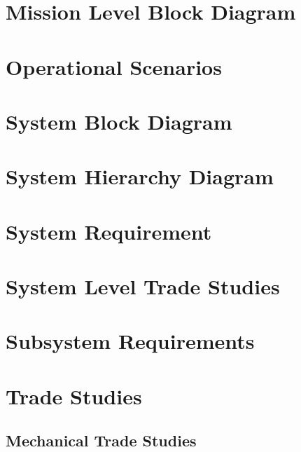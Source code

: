 \documentclass[12pt, letterpaper]{article}
\begin{document}
\section{Mission Level Block Diagram}
\label{sect:MLBD}
\newpage
\section{Operational Scenarios}
\label{sect:FFBD}

\begin{landscape}
\section{System Block Diagram}
\label{sect:SBD}
\newpage
\section{System Hierarchy Diagram}
\label{sect:SHD}
\end{landscape}

\section{System Requirement}
\captionsetup[table]{list=no}
\captionsetup[table]{list=yes}
\setcounter{table}{\ref{risktable}}

\section{System Level Trade Studies}
\newpage
\section{Subsystem Requirements}	%
\label{sect:Subsystem Requirements}
\captionsetup[table]{list=no}







\captionsetup[table]{list=yes}
\setcounter{table}{\ref{tab:communication}}

\section{Trade Studies}
\subsection{Mechanical Trade Studies}
\label{sect:mech_to}

\end{document}
